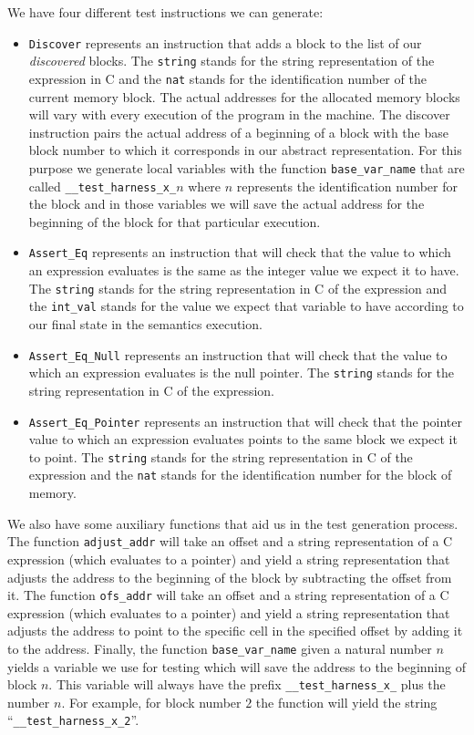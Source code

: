 We have four different test instructions we can generate:

\begin{itemize}
  \item{\verb|Discover| represents an instruction that adds a block to the list of our \textit{discovered} blocks.
  The \verb|string| stands for the string representation of the expression in C and the \verb|nat| stands for the identification number of the current memory block.
  The actual addresses for the allocated memory blocks will vary with every execution of the program in the machine.
  The discover instruction pairs the actual address of a beginning of a block with the base block number to which it corresponds in our abstract representation.
  For this purpose we generate local variables with the function \verb|base_var_name| that are called \verb|__test_harness_x_|$n$ where $n$ represents the identification number for the block and in those variables we will save the actual address for the beginning of the block for that particular execution.}
  \item{\verb|Assert_Eq| represents an instruction that will check that the value to which an expression evaluates is the same as the integer value we expect it to have.
  The \verb|string| stands for the string representation in C of the expression and the \verb|int_val| stands for the value we expect that variable to have according to our final state in the semantics execution.}
  \item{\verb|Assert_Eq_Null| represents an instruction that will check that the value to which an expression evaluates is the null pointer.
  The \verb|string| stands for the string representation in C of the expression.}
  \item{\verb|Assert_Eq_Pointer| represents an instruction that will check that the pointer value to which an expression evaluates points to the same block we expect it to point.
  The \verb|string| stands for the string representation in C of the expression and the \verb|nat| stands for the identification number for the block of memory.}
\end{itemize}

We also have some auxiliary functions that aid us in the test generation process.
The function \verb|adjust_addr| will take an offset and a string representation of a C expression (which evaluates to a pointer) and yield a string representation that adjusts the address to the beginning of the block by subtracting the offset from it.
The function \verb|ofs_addr| will take an offset and a string representation of a C expression (which evaluates to a pointer) and yield a string representation that adjusts the address to point to the specific cell in the specified offset by adding it to the address.
Finally, the function \verb|base_var_name| given a natural number $n$ yields a variable we use for testing which will save the address to the beginning of block $n$.
This variable will always have the prefix \verb|__test_harness_x_| plus the number $n$.
For example, for block number $2$ the function will yield the string ``\verb|__test_harness_x_2|''.


